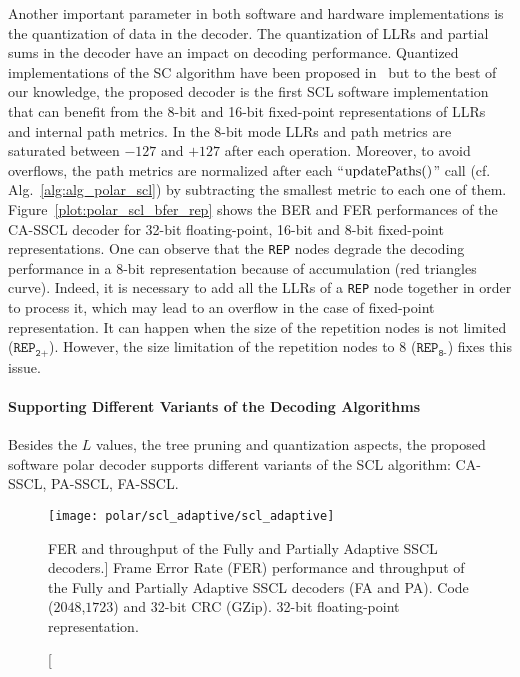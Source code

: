 Another important parameter in both software and hardware implementations is the
quantization of data in the decoder. The quantization of LLRs and partial sums
in the decoder have an impact on decoding performance. Quantized implementations
of the SC algorithm have been proposed in~\cite{Giard2016} but to the best of
our knowledge, the proposed decoder is the first SCL software implementation
that can benefit from the 8-bit and 16-bit fixed-point representations of LLRs
and internal path metrics. In the 8-bit mode LLRs and path metrics are saturated
between $-127$ and $+127$ after each operation. Moreover, to avoid overflows,
the path metrics are normalized after each ``$\operatorname*{updatePaths}()$'' call (cf.
Alg.~\ref{alg:alg_polar_scl}) by subtracting the smallest metric to each one of
them. Figure~\ref{plot:polar_scl_bfer_rep} shows the BER and FER performances of
the CA-SSCL decoder for 32-bit floating-point, 16-bit and 8-bit fixed-point
representations. One can observe that the \verb|REP| nodes degrade the decoding
performance in a 8-bit representation because of accumulation (red triangles
curve). Indeed, it is necessary to add all the LLRs of a \verb|REP| node
together in order to process it, which may lead to an overflow in the case of
fixed-point representation. It can happen when the size of the repetition nodes
is not limited ($\texttt{REP}_\texttt{2+}$). However, the size limitation of the
repetition nodes to 8 ($\texttt{REP}_\texttt{8-}$) fixes this issue.

\paragraph{Supporting Different Variants of the Decoding Algorithms}

Besides the $L$ values, the tree pruning and quantization aspects, the proposed
software polar decoder supports different variants of the SCL algorithm:
CA-SSCL, PA-SSCL, FA-SSCL.

\begin{figure}[htp]
  \centering
  \texttt{[image: polar/scl\_adaptive/scl\_adaptive]}
  \caption
    [FER and throughput of the Fully and Partially Adaptive SSCL decoders.]
    {Frame Error Rate (FER) performance and throughput of the Fully and
    Partially Adaptive SSCL decoders (FA and PA). Code ($2048$,$1723$) and
    32-bit CRC (GZip). 32-bit floating-point representation.}
  \label{plot:polar_scl_adaptive}
\end{figure}

